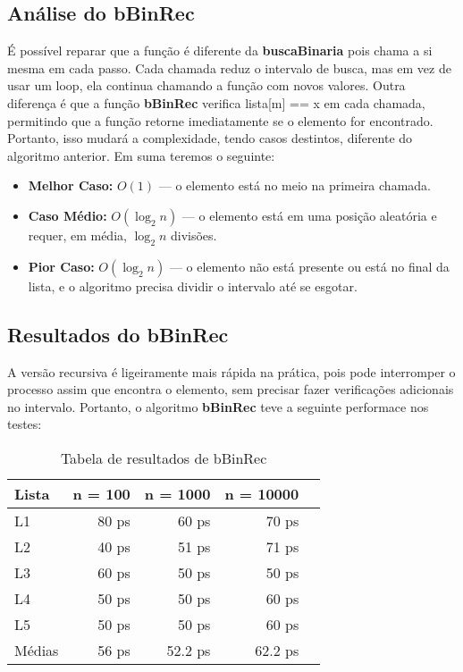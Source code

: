 \subsection{Análise do bBinRec}

É possível reparar que a função é diferente da \textbf{buscaBinaria} pois chama a si mesma em cada passo. Cada chamada reduz o intervalo de busca, mas em vez de usar um loop, ela continua chamando a função com novos valores. Outra diferença é que a função \textbf{bBinRec} verifica lista[m] == x em cada chamada, permitindo que a função retorne imediatamente se o elemento for encontrado. Portanto, isso mudará a complexidade, tendo casos destintos, diferente do algoritmo anterior.
Em suma teremos o seguinte:

\begin{itemize}
	\item \textbf{Melhor Caso:} $O(1)$ — o elemento está no meio na primeira chamada.
	\item \textbf{Caso Médio:} $O(\log_2 n)$ — o elemento está em uma posição aleatória e requer, em média, $\log_2 n$ divisões.
	\item \textbf{Pior Caso:} $O(\log_2 n)$ — o elemento não está presente ou está no final da lista, e o algoritmo precisa dividir o intervalo até se esgotar.
\end{itemize}

\subsection{Resultados do bBinRec}

A versão recursiva é ligeiramente mais rápida na prática, pois pode interromper o processo assim que encontra o elemento, sem precisar fazer verificações adicionais no intervalo.
Portanto, o algoritmo \textbf{bBinRec} teve a seguinte performace nos testes:

\begin{table}[h!]
	\centering
	\caption{Tabela de resultados de bBinRec}
	\label{tab:bBin_rec_result}
	\begin{tabular}{lrrrr}
		\toprule
		Lista   & n = 100   & n = 1000  & n = 10000 \\
		\midrule
		L1      & 80 ps    & 60 ps    & 70 ps  \\
		L2      & 40 ps    & 51 ps    & 71 ps  \\
		L3      & 60 ps    & 50 ps    & 50 ps  \\
		L4      & 50 ps    & 50 ps    & 60 ps  \\
		L5      & 50 ps    & 50 ps    & 60 ps  \\
		\midrule
		Médias  & 56 ps  & 52.2 ps  & 62.2 ps \\
		\bottomrule
	\end{tabular}
\end{table}

